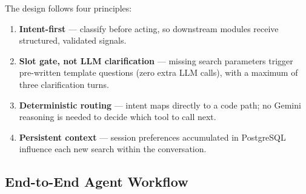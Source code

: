 \documentclass[12pt,a4paper]{article}
\begin{document}
The design follows four principles:
\begin{enumerate}[label=(\roman*)]
  \item \textbf{Intent-first} --- classify before acting,
        so downstream modules receive structured, validated signals.
  \item \textbf{Slot gate, not LLM clarification} --- missing
        search parameters trigger pre-written template questions
        (zero extra LLM calls), with a maximum of three
        clarification turns.
  \item \textbf{Deterministic routing} --- intent maps directly
        to a code path; no Gemini reasoning is needed to decide
        which tool to call next.
  \item \textbf{Persistent context} --- session preferences accumulated
        in PostgreSQL influence each new search within the conversation.
\end{enumerate}

\subsection{End-to-End Agent Workflow}
\end{document}
